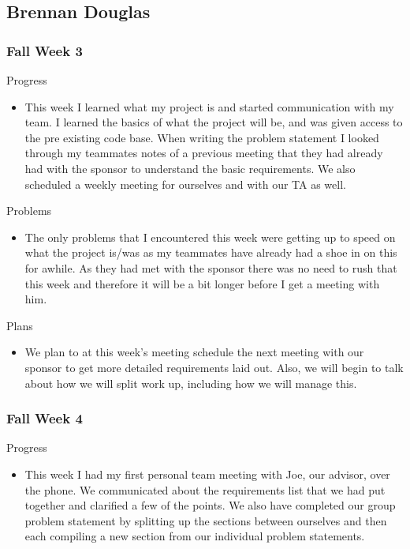 \subsection{Brennan Douglas}

    \subsubsection{Fall Week 3}
        
        \noindent
        Progress
        \begin{itemize}
            \item This week I learned what my project is and started communication with my team.  I learned the basics of what the project will be, and was given access to the pre existing code base.  When writing the problem statement I looked through my teammates notes of a previous meeting that they had already had with the sponsor to understand the basic requirements.  We also scheduled a weekly meeting for ourselves and with our TA as well.
        \end{itemize}
        
        \noindent
        Problems
        \begin{itemize}
            \item The only problems that I encountered this week were getting up to speed on what the project is/was as my teammates have already had a shoe in on this for awhile.  As they had met with the sponsor there was no need to rush that this week and therefore it will be a bit longer before I get a meeting with him.
        \end{itemize}
        
        \noindent
        Plans
        \begin{itemize}
            \item We plan to at this week’s meeting schedule the next meeting with our sponsor to get more detailed requirements laid out.  Also, we will begin to talk about how we will split work up, including how we will manage this.
        \end{itemize}
    
    \subsubsection{Fall Week 4}
    
        \noindent
        Progress
        \begin{itemize}
            \item This week I had my first personal team meeting with Joe, our advisor, over the phone.  We communicated about the requirements list that we had put together and clarified a few of the points.  We also have completed our group problem statement by splitting up the sections between ourselves and then each compiling a new section from our individual problem statements.
        \end{itemize}
        

